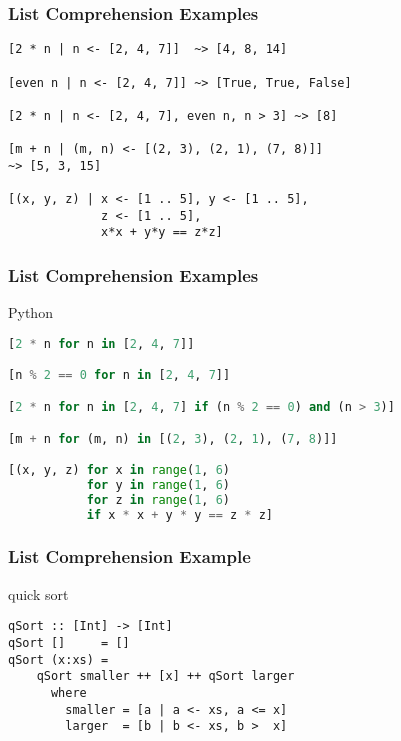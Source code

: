 \documentclass[dvipsnames]{beamer}
\theoremstyle{plain}
\begin{document}
\begin{frame}[fragile]
  \frametitle{List Comprehension Examples}

  \begin{exampleblock}{}
    \begin{lstlisting}
[2 * n | n <- [2, 4, 7]]  ~> [4, 8, 14]

[even n | n <- [2, 4, 7]] ~> [True, True, False]

[2 * n | n <- [2, 4, 7], even n, n > 3] ~> [8]

[m + n | (m, n) <- [(2, 3), (2, 1), (7, 8)]]
~> [5, 3, 15]

[(x, y, z) | x <- [1 .. 5], y <- [1 .. 5],
             z <- [1 .. 5],
             x*x + y*y == z*z]
    \end{lstlisting}
  \end{exampleblock}
\end{frame}

\begin{frame}[fragile]
  \frametitle{List Comprehension Examples}

  \begin{exampleblock}{Python}
    \begin{lstlisting}[language=Python]
[2 * n for n in [2, 4, 7]]

[n % 2 == 0 for n in [2, 4, 7]]

[2 * n for n in [2, 4, 7] if (n % 2 == 0) and (n > 3)]

[m + n for (m, n) in [(2, 3), (2, 1), (7, 8)]]

[(x, y, z) for x in range(1, 6)
           for y in range(1, 6)
           for z in range(1, 6)
           if x * x + y * y == z * z]
    \end{lstlisting}
  \end{exampleblock}
\end{frame}

\begin{frame}[fragile]
  \frametitle{List Comprehension Example}

  \begin{exampleblock}{quick sort}
    \begin{lstlisting}
qSort :: [Int] -> [Int]
qSort []     = []
qSort (x:xs) =
    qSort smaller ++ [x] ++ qSort larger
      where
        smaller = [a | a <- xs, a <= x]
        larger  = [b | b <- xs, b >  x]
    \end{lstlisting}
  \end{exampleblock}
\end{frame}
\end{document}

